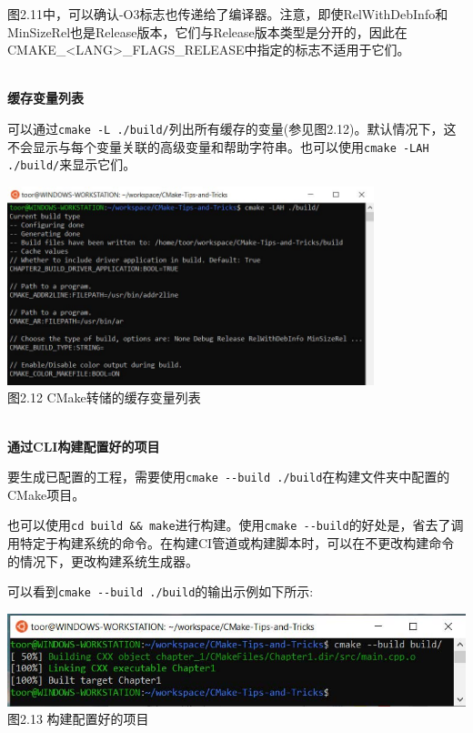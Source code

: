 图2.11中，可以确认-O3标志也传递给了编译器。注意，即使RelWithDebInfo和MinSizeRel也是Release版本，它们与Release版本类型是分开的，因此在CMAKE\_<LANG>\_FLAGS\_RELEASE中指定的标志不适用于它们。

\hspace*{\fill} \\ %
\noindent
\textbf{缓存变量列表}

可以通过\texttt{cmake -L ./build/}列出所有缓存的变量(参见图2.12)。默认情况下，这不会显示与每个变量关联的高级变量和帮助字符串。也可以使用\texttt{cmake -LAH ./build/}来显示它们。

\begin{center}
\includegraphics[width=0.8\textwidth]{content/1/chapter2/images/12.jpg}\\
图2.12 CMake转储的缓存变量列表
\end{center}

\hspace*{\fill} \\ %
\noindent
\textbf{通过CLI构建配置好的项目}

要生成已配置的工程，需要使用\texttt{cmake -{}-build ./build}在构建文件夹中配置的CMake项目。

也可以使用\texttt{cd build \&\& make}进行构建。使用\texttt{cmake -{}-build}的好处是，省去了调用特定于构建系统的命令。在构建CI管道或构建脚本时，可以在不更改构建命令的情况下，更改构建系统生成器。

可以看到\texttt{cmake -{}-build ./build}的输出示例如下所示:

\begin{center}
\includegraphics[width=1.\textwidth]{content/1/chapter2/images/13.jpg}\\
图2.13 构建配置好的项目
\end{center}


